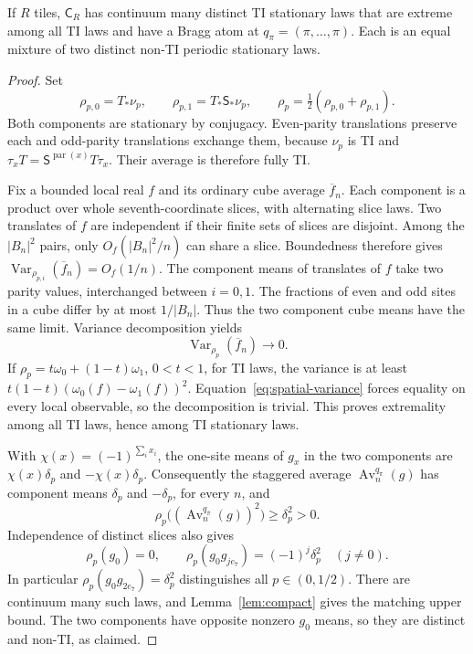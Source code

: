 \begin{proposition}\label{prop:crystal}
If $R$ tiles, $\mathsf C_R$ has continuum many distinct TI stationary laws that are extreme among all TI laws and have a Bragg atom at $q_\pi=(\pi,\ldots,\pi)$. Each is an equal mixture of two distinct non-TI periodic stationary laws.
\end{proposition}
\begin{proof}
Set
\[
 \rho_{p,0}=T_*\nu_p,\qquad \rho_{p,1}=T_*\mathsf S_*\nu_p,
 \qquad \rho_p=\tfrac12(\rho_{p,0}+\rho_{p,1}).
\]
Both components are stationary by conjugacy. Even-parity translations preserve each and odd-parity translations exchange them, because $\nu_p$ is TI and $\tau_xT=\mathsf S^{\operatorname{par}(x)}T\tau_x$. Their average is therefore fully TI.

Fix a bounded local real $f$ and its ordinary cube average $\overline f_n$. Each component is a product over whole seventh-coordinate slices, with alternating slice laws. Two translates of $f$ are independent if their finite sets of slices are disjoint. Among the $|B_n|^2$ pairs, only $O_f(|B_n|^2/n)$ can share a slice. Boundedness therefore gives
$\operatorname{Var}_{\rho_{p,i}}(\overline f_n)=O_f(1/n)$.
The component means of translates of $f$ take two parity values, interchanged between $i=0,1$. The fractions of even and odd sites in a cube differ by at most $1/|B_n|$. Thus the two component cube means have the same limit. Variance decomposition yields
\begin{equation}\label{eq:spatial-variance}
 \operatorname{Var}_{\rho_p}(\overline f_n)\longrightarrow0.
\end{equation}
If $\rho_p=t\omega_0+(1-t)\omega_1$, $0<t<1$, for TI laws, the variance is at least
$t(1-t)(\omega_0(f)-\omega_1(f))^2$.
Equation~\eqref{eq:spatial-variance} forces equality on every local observable, so the decomposition is trivial. This proves extremality among all TI laws, hence among TI stationary laws.

With $\chi(x)=(-1)^{\sum_i x_i}$, the one-site means of $g_x$ in the two components are $\chi(x)\delta_p$ and $-\chi(x)\delta_p$. Consequently the staggered average $\operatorname{Av}_n^{q_\pi}(g)$ has component means $\delta_p$ and $-\delta_p$, for every $n$, and
\[
 \rho_p\bigl((\operatorname{Av}_n^{q_\pi}(g))^2\bigr)\ge\delta_p^2>0.
\]
Independence of distinct slices also gives
\[
 \rho_p(g_0)=0,\qquad
 \rho_p(g_0g_{je_7})=(-1)^j\delta_p^2\quad(j\ne0).
\]
In particular $\rho_p(g_0g_{2e_7})=\delta_p^2$ distinguishes all $p\in(0,1/2)$. There are continuum many such laws, and Lemma~\ref{lem:compact} gives the matching upper bound. The two components have opposite nonzero $g_0$ means, so they are distinct and non-TI, as claimed.
\end{proof}


